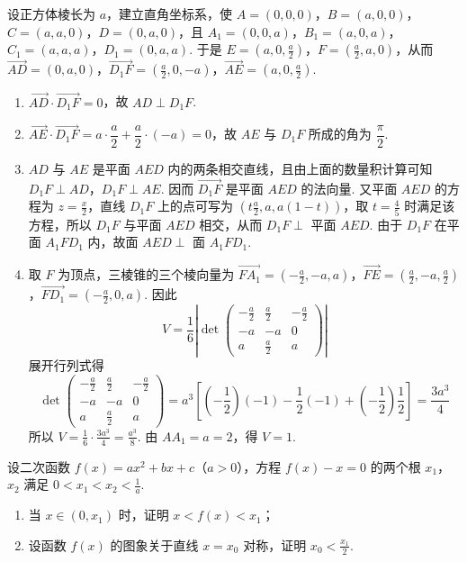 \documentclass[UTF8,a4paper,oneside,11pt]{ctexbook}
\begin{document}
\begin{solution}
设正方体棱长为 \(a\)，建立直角坐标系，使 \(A=(0,0,0)\)，\(B=(a,0,0)\)，\(C=(a,a,0)\)，\(D=(0,a,0)\)，且 \(A_{1}=(0,0,a)\)，\(B_{1}=(a,0,a)\)，\(C_{1}=(a,a,a)\)，\(D_{1}=(0,a,a)\).
于是 \(E=(a,0,\frac{a}{2})\)，\(F=(\frac{a}{2},a,0)\)，从而 \(\overrightarrow{AD}=(0,a,0)\)，\(\overrightarrow{D_{1}F}=(\frac{a}{2},0,-a)\)，\(\overrightarrow{AE}=(a,0,\frac{a}{2})\).
\begin{enumerate}
\item \(\overrightarrow{AD}\cdot\overrightarrow{D_{1}F}=0\)，故 \(AD\perp D_{1}F\).
\item \(\overrightarrow{AE}\cdot\overrightarrow{D_{1}F}=a\cdot\dfrac{a}{2}+\dfrac{a}{2}\cdot(-a)=0\)，故 \(AE\) 与 \(D_{1}F\) 所成的角为 \(\dfrac{\pi}{2}\).
\item \(AD\) 与 \(AE\) 是平面 \(AED\) 内的两条相交直线，且由上面的数量积计算可知 \(D_{1}F\perp AD\)，\(D_{1}F\perp AE\). 因而 \(\overrightarrow{D_{1}F}\) 是平面 \(AED\) 的法向量. 又平面 \(AED\) 的方程为 \(z=\frac{x}{2}\)，直线 \(D_{1}F\) 上的点可写为 \((t\frac{a}{2},a,a(1-t))\)，取 \(t=\frac{4}{5}\) 时满足该方程，所以 \(D_{1}F\) 与平面 \(AED\) 相交，从而 \(D_{1}F\perp\) 平面 \(AED\). 由于 \(D_{1}F\) 在平面 \(A_{1}FD_{1}\) 内，故面 \(AED\perp\) 面 \(A_{1}FD_{1}\).
\item 取 \(F\) 为顶点，三棱锥的三个棱向量为 \(\overrightarrow{FA_{1}}=\left(-\frac{a}{2},-a,a\right)\)，\(\overrightarrow{FE}=\left(\frac{a}{2},-a,\frac{a}{2}\right)\)，\(\overrightarrow{FD_{1}}=\left(-\frac{a}{2},0,a\right)\).
因此
\[
V=\frac{1}{6}\left|\det\begin{pmatrix}
-\frac{a}{2}&\frac{a}{2}&-\frac{a}{2}\\
-a&-a&0\\
a&\frac{a}{2}&a
\end{pmatrix}\right|
\]
展开行列式得
\[
\det\begin{pmatrix}
-\frac{a}{2}&\frac{a}{2}&-\frac{a}{2}\\
-a&-a&0\\
a&\frac{a}{2}&a
\end{pmatrix}
=a^{3}\left[\left(-\frac{1}{2}\right)(-1)-\frac{1}{2}(-1)+\left(-\frac{1}{2}\right)\frac{1}{2}\right]
=\frac{3a^{3}}{4}
\]
所以 \(V=\frac{1}{6}\cdot\frac{3a^{3}}{4}=\frac{a^{3}}{8}\).
由 \(AA_{1}=a=2\)，得 \(V=1\).
\end{enumerate}
\end{solution}

\begin{problem}
设二次函数 \(f(x) = ax^{2} + bx + c\)（\(a > 0\)），方程 \(f(x) - x = 0\) 的两个根 \(x_{1}\)，\(x_{2}\) 满足 \(0 < x_{1} < x_{2} < \frac{1}{a}\).

\begin{enumerate}
\item 当 \(x \in (0, x_{1})\) 时，证明 \(x < f(x) < x_{1}\)；

\item 设函数 \(f(x)\) 的图象关于直线 \(x = x_{0}\) 对称，证明 \(x_{0} < \frac{x_{1}}{2}\).
\end{enumerate}
\end{problem}
\end{document}
